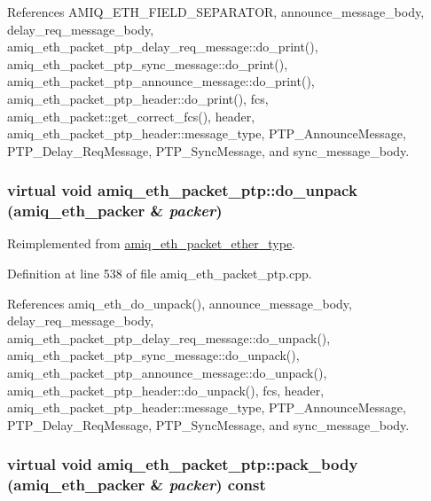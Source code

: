 References AMIQ\_\-ETH\_\-FIELD\_\-SEPARATOR, announce\_\-message\_\-body, delay\_\-req\_\-message\_\-body, amiq\_\-eth\_\-packet\_\-ptp\_\-delay\_\-req\_\-message::do\_\-print(), amiq\_\-eth\_\-packet\_\-ptp\_\-sync\_\-message::do\_\-print(), amiq\_\-eth\_\-packet\_\-ptp\_\-announce\_\-message::do\_\-print(), amiq\_\-eth\_\-packet\_\-ptp\_\-header::do\_\-print(), fcs, amiq\_\-eth\_\-packet::get\_\-correct\_\-fcs(), header, amiq\_\-eth\_\-packet\_\-ptp\_\-header::message\_\-type, PTP\_\-AnnounceMessage, PTP\_\-Delay\_\-ReqMessage, PTP\_\-SyncMessage, and sync\_\-message\_\-body.\hypertarget{classamiq__eth__packet__ptp_a831addd66dff7e42f2e2e9edb6f976b3}{
\subsubsection[{do\_\-unpack}]{\setlength{\rightskip}{0pt plus 5cm}virtual void amiq\_\-eth\_\-packet\_\-ptp::do\_\-unpack ({\bf amiq\_\-eth\_\-packer} \& {\em packer})}}
\label{classamiq__eth__packet__ptp_a831addd66dff7e42f2e2e9edb6f976b3}


Reimplemented from \hyperlink{classamiq__eth__packet__ether__type_a0c86ef80c46bbed384739b23e5efb0ef}{amiq\_\-eth\_\-packet\_\-ether\_\-type}.

Definition at line 538 of file amiq\_\-eth\_\-packet\_\-ptp.cpp.

References amiq\_\-eth\_\-do\_\-unpack(), announce\_\-message\_\-body, delay\_\-req\_\-message\_\-body, amiq\_\-eth\_\-packet\_\-ptp\_\-delay\_\-req\_\-message::do\_\-unpack(), amiq\_\-eth\_\-packet\_\-ptp\_\-sync\_\-message::do\_\-unpack(), amiq\_\-eth\_\-packet\_\-ptp\_\-announce\_\-message::do\_\-unpack(), amiq\_\-eth\_\-packet\_\-ptp\_\-header::do\_\-unpack(), fcs, header, amiq\_\-eth\_\-packet\_\-ptp\_\-header::message\_\-type, PTP\_\-AnnounceMessage, PTP\_\-Delay\_\-ReqMessage, PTP\_\-SyncMessage, and sync\_\-message\_\-body.\hypertarget{classamiq__eth__packet__ptp_aa9c14abac259c28ca17c69eecaa5a403}{
\subsubsection[{pack\_\-body}]{\setlength{\rightskip}{0pt plus 5cm}virtual void amiq\_\-eth\_\-packet\_\-ptp::pack\_\-body ({\bf amiq\_\-eth\_\-packer} \& {\em packer}) const}}
\label{classamiq__eth__packet__ptp_aa9c14abac259c28ca17c69eecaa5a403}


